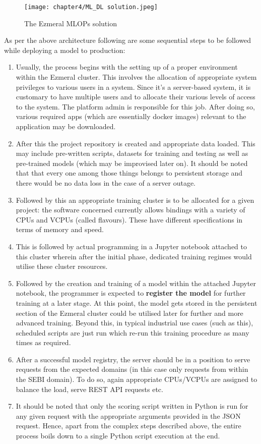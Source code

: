 \begin{figure}[h]
  \centering
  \texttt{[image: chapter4/ML\_DL solution.jpeg]}
  \caption{The Ezmeral MLOPs solution}
  \label{fig:ml_dl_sol}
\end{figure}

As per the above architecture following are some sequential steps to be followed while deploying a model to production: \cite{Chiang2020}

\begin{enumerate}
  \item Usually, the process begins with the setting up of a proper environment within the Ezmeral cluster. This involves the allocation of appropriate system privileges to various users in a system. Since it’s a server-based system, it is customary to have multiple users and to allocate their various levels of access to the system. The platform admin is responsible for this job. After doing so, various required apps (which are essentially docker images) relevant to the application may be downloaded.
  \item After this the project repository is created and appropriate data loaded. This may include pre-written scripts, datasets for training and testing as well as pre-trained models (which may be improvised later on). It should be noted that that every one among those things belongs to persistent storage and there would be no data loss in the case of a server outage.
  \item Followed by this an appropriate training cluster is to be allocated for a given project: the software concerned currently allows bindings with a variety of CPUs and VCPUs (called flavours). These have different specifications in terms of memory and speed.
  \item  This is followed by actual programming in a Jupyter notebook attached to this cluster wherein after the initial phase, dedicated training regimes would utilise these cluster resources.
  \item  Followed by the creation and training of a model within the attached Jupyter notebook, the programmer is expected to \textbf{register the model} for further training at a later stage. At this point, the model gets stored in the persistent section of the Ezmeral cluster could be utilised later for further and more advanced training. Beyond this, in typical industrial use cases (such as this), scheduled scripts are just run which re-run this training procedure as many times as required.
  \item  After a successful model registry, the server should be in a position to serve requests from the expected domains (in this case only requests from within the SEBI domain). To do so, again appropriate CPUs/VCPUs are assigned to balance the load, serve REST API requests etc.
  \item It should be noted that only the scoring script written in Python is run for any given request with the appropriate arguments provided in the JSON request. Hence, apart from the complex steps described above, the entire process boils down to a single Python script execution at the end. \par


\end{enumerate}
